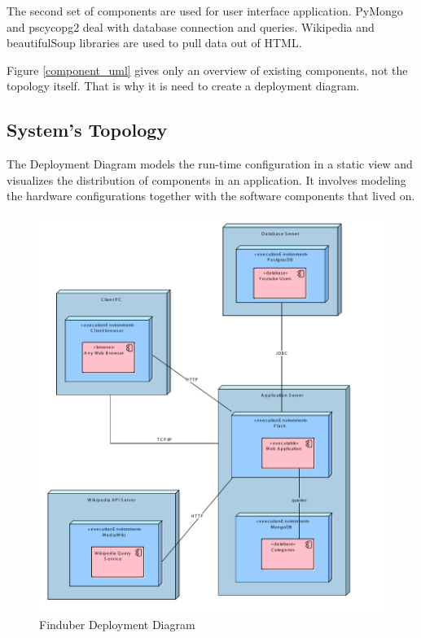 The second set of components are used for user interface application. PyMongo and pscycopg2 deal with database connection and queries. Wikipedia and beautifulSoup libraries are used to pull data out of HTML. 

Figure \ref{component_uml} gives only an overview of existing components, not the topology itself. That is why it is need to create a deployment diagram. 

\subsection{System's Topology}

The Deployment Diagram models the run-time configuration in a static view and visualizes the distribution of components in an application. It involves modeling the hardware configurations together with the software components that lived on.

\begin{figure}[!ht]
\centering
\includegraphics[width=15cm]{Deployment}
\caption{Finduber Deployment Diagram}\label{deploy_uml}
\end{figure}

